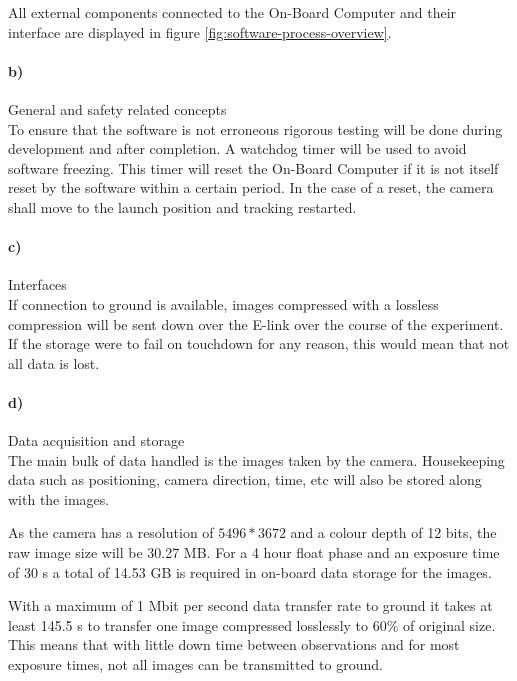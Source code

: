 All external components connected to the On-Board Computer and their interface are displayed in figure \ref{fig:software-process-overview}.

\paragraph{b)} General and safety related concepts\\

To ensure that the software is not erroneous rigorous testing will be done during development and after completion. A watchdog timer will be used to avoid software freezing. This timer will reset the On-Board Computer if it is not itself reset by the software within a certain period. In the case of a reset, the camera shall move to the launch position and tracking restarted.

\paragraph{c)} Interfaces\\

If connection to ground is available, images compressed with a lossless compression will be sent down over the E-link over the course of the experiment. If the storage were to fail on touchdown for any reason, this would mean that not all data is lost.





\paragraph{d)} Data acquisition and storage\\

The main bulk of data handled is the images taken by the camera. Housekeeping data such as positioning, camera direction, time, etc will also be stored along with the images.

As the camera has a resolution of $5496 * 3672$ and a colour depth of 12 bits, the raw image size will be 30.27 MB. For a 4 hour float phase and an exposure time of 30 s a total of  14.53 GB is required in on-board data storage for the images. 

With a maximum of 1 Mbit per second data transfer rate to ground it takes at least 145.5 s to transfer one image compressed losslessly to 60\% of original size. This means that with little down time between observations and for most exposure times, not all images can be transmitted to ground.

